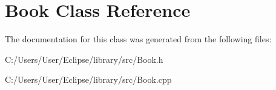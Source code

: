 \hypertarget{class_book}{\section{Book Class Reference}
\label{class_book}
}


The documentation for this class was generated from the following files\+:\begin{DoxyCompactItemize}
\item 
C\+:/\+Users/\+User/\+Eclipse/library/src/Book.\+h\item 
C\+:/\+Users/\+User/\+Eclipse/library/src/Book.\+cpp\end{DoxyCompactItemize}
